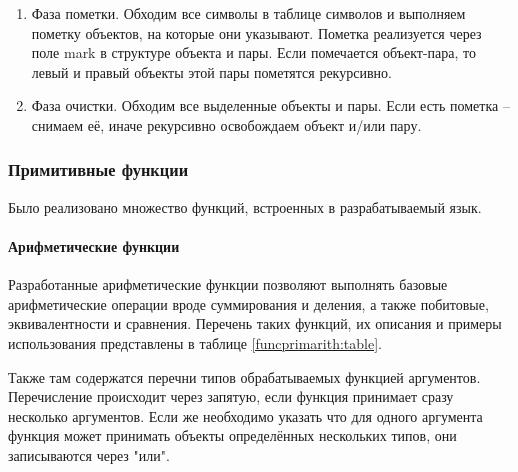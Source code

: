 \begin{enumerate}
	\item Фаза пометки.
	Обходим все символы в таблице символов и выполняем пометку объектов, на которые они указывают. Пометка реализуется через поле mark в структуре объекта и пары. Если помечается объект-пара, то левый и правый объекты этой пары пометятся рекурсивно.
	
	\item Фаза очистки.
	Обходим все выделенные объекты и пары. Если есть пометка -- снимаем её, иначе рекурсивно освобождаем объект и/или пару.
	
\end{enumerate}

\subsubsection{Примитивные функции}

Было реализовано множество функций, встроенных в разрабатываемый язык.

\paragraph{Арифметические функции}

Разработанные арифметические функции позволяют выполнять базовые арифметические операции вроде суммирования и деления, а также побитовые, эквивалентности и сравнения. Перечень таких функций, их описания и примеры использования представлены в таблице \ref{funcprimarith:table}.

Также там содержатся перечни типов обрабатываемых функцией аргументов. Перечисление происходит через запятую, если функция принимает сразу несколько аргументов. Если же необходимо указать что для одного аргумента функция может принимать объекты определённых нескольких типов, они записываются через "или".


